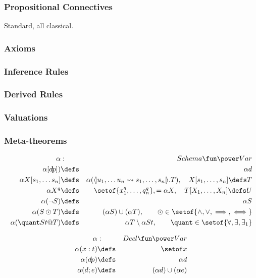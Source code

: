 \subsubsection{Propositional Connectives}

Standard, all classical.


\subsubsection{Axioms}


\subsubsection{Inference Rules}


\subsubsection{Derived Rules}


\subsubsection{Valuations}


\subsubsection{Meta-theorems}


\begin{eqnarray*}
   \alpha &:& Schema \fun \power Var
\\ \alpha[d\!|\!p]) &\defs& \alpha d
\\ \alpha X[s_1,\ldots s_n] &\defs& \alpha(\bindof{u_1,\ldots u_n \bto s_1,\ldots,s_n}.T), \quad X[s_1,\ldots,s_n] \defs T
\\ \alpha X^q &\defs& \setof{x_1^q,\ldots,q_n^q}, = \alpha X, \quad T[X_1,\ldots,X_n] \defs U
\\ \alpha(\lnot S) &\defs& \alpha S
\\ \alpha(S \odot T) &\defs& (\alpha S)  \cup (\alpha T), \qquad \odot \in \setof{\land,\lor,\implies,\iff}
\\ \alpha(\quant St @ T) &\defs& \alpha T \setminus \alpha St, \qquad \quant \in \setof{\forall,\exists,\exists_1}
\end{eqnarray*}


\begin{eqnarray*}
   \alpha &:& Decl \fun \power Var
\\ \alpha (x:t) &\defs& \setof x
\\ \alpha (d\!|\!p) &\defs& \alpha d 
\\ \alpha (d;e) &\defs& (\alpha d) \cup (\alpha e)
\end{eqnarray*}

